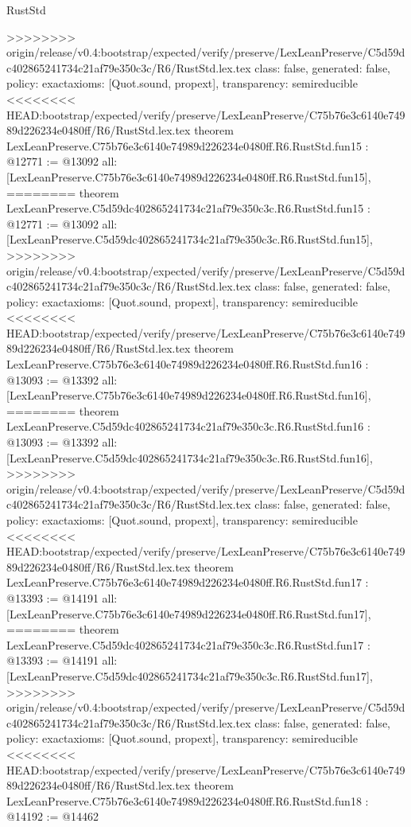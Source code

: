 \begin{lexlean}{RustStd}
\begin{coremodule}
{\begin{coremodule}
{{{{{{{{{{{{{{{{{{>>>>>>>> origin/release/v0.4:bootstrap/expected/verify/preserve/LexLeanPreserve/C5d59dc402865241734c21af79e350c3c/R6/RustStd.lex.tex
  class: false,
  generated: false,
  policy: exact{axioms: [Quot.sound, propext]},
  transparency: semireducible
}
<<<<<<<< HEAD:bootstrap/expected/verify/preserve/LexLeanPreserve/C75b76e3c6140e74989d226234e0480ff/R6/RustStd.lex.tex
theorem LexLeanPreserve.C75b76e3c6140e74989d226234e0480ff.R6.RustStd.fun15 : @12771 := @13092 {
  all: [LexLeanPreserve.C75b76e3c6140e74989d226234e0480ff.R6.RustStd.fun15],
========
theorem LexLeanPreserve.C5d59dc402865241734c21af79e350c3c.R6.RustStd.fun15 : @12771 := @13092 {
  all: [LexLeanPreserve.C5d59dc402865241734c21af79e350c3c.R6.RustStd.fun15],
>>>>>>>> origin/release/v0.4:bootstrap/expected/verify/preserve/LexLeanPreserve/C5d59dc402865241734c21af79e350c3c/R6/RustStd.lex.tex
  class: false,
  generated: false,
  policy: exact{axioms: [Quot.sound, propext]},
  transparency: semireducible
}
<<<<<<<< HEAD:bootstrap/expected/verify/preserve/LexLeanPreserve/C75b76e3c6140e74989d226234e0480ff/R6/RustStd.lex.tex
theorem LexLeanPreserve.C75b76e3c6140e74989d226234e0480ff.R6.RustStd.fun16 : @13093 := @13392 {
  all: [LexLeanPreserve.C75b76e3c6140e74989d226234e0480ff.R6.RustStd.fun16],
========
theorem LexLeanPreserve.C5d59dc402865241734c21af79e350c3c.R6.RustStd.fun16 : @13093 := @13392 {
  all: [LexLeanPreserve.C5d59dc402865241734c21af79e350c3c.R6.RustStd.fun16],
>>>>>>>> origin/release/v0.4:bootstrap/expected/verify/preserve/LexLeanPreserve/C5d59dc402865241734c21af79e350c3c/R6/RustStd.lex.tex
  class: false,
  generated: false,
  policy: exact{axioms: [Quot.sound, propext]},
  transparency: semireducible
}
<<<<<<<< HEAD:bootstrap/expected/verify/preserve/LexLeanPreserve/C75b76e3c6140e74989d226234e0480ff/R6/RustStd.lex.tex
theorem LexLeanPreserve.C75b76e3c6140e74989d226234e0480ff.R6.RustStd.fun17 : @13393 := @14191 {
  all: [LexLeanPreserve.C75b76e3c6140e74989d226234e0480ff.R6.RustStd.fun17],
========
theorem LexLeanPreserve.C5d59dc402865241734c21af79e350c3c.R6.RustStd.fun17 : @13393 := @14191 {
  all: [LexLeanPreserve.C5d59dc402865241734c21af79e350c3c.R6.RustStd.fun17],
>>>>>>>> origin/release/v0.4:bootstrap/expected/verify/preserve/LexLeanPreserve/C5d59dc402865241734c21af79e350c3c/R6/RustStd.lex.tex
  class: false,
  generated: false,
  policy: exact{axioms: [Quot.sound, propext]},
  transparency: semireducible
}
<<<<<<<< HEAD:bootstrap/expected/verify/preserve/LexLeanPreserve/C75b76e3c6140e74989d226234e0480ff/R6/RustStd.lex.tex
theorem LexLeanPreserve.C75b76e3c6140e74989d226234e0480ff.R6.RustStd.fun18 : @14192 := @14462 {
}}}}}}}}}}}}}}}}}}}}}
\end{coremodule}}
\end{coremodule}
\end{lexlean}

